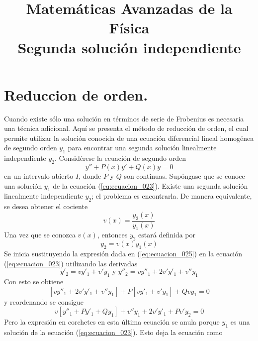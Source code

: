 
\title{Matemáticas Avanzadas de la Física \\ {\large Segunda solución independiente}}
\date{ }

\renewcommand\labelenumii{\theenumi.{\arabic{enumii}}}
\maketitle
\fontsize{14}{14}\selectfont
\section{Reduccion de orden.}
Cuando existe sólo una solución en términos de serie de Frobenius es necesaria una técnica adicional. Aquí se presenta el método de reducción de orden, el cual permite utilizar la solución conocida de una ecuación diferencial lineal homogénea de segundo orden $y_{1}$ para encontrar una segunda solución linealmente independiente $y_{2}$. Considérese la ecuación de segundo orden
\begin{equation}
y'' + P(x) y' + Q(x) y = 0 
\label{eq:ecuacion_023}
\end{equation}
en un intervalo abierto $I$, donde $P$ y $Q$ son continuas. Supóngase que se conoce una solución $y_{1}$ de la ecuación (\ref{eq:ecuacion_023}). Existe una segunda solución linealmente independiente $y_{2}$; el problema es encontrarla. De manera equivalente, se desea obtener el cociente
\begin{equation}
v(x) = \dfrac{y_{2} (x)}{y_{1} (x)}
\label{eq:ecuacion_024}
\end{equation}
Una vez que se conozca $v(x)$, entonces $y_{2}$ estará definida por
\begin{equation}
y_{2} =  v(x) y_{1} (x)
\label{eq:ecuacion_025}
\end{equation}
Se inicia sustituyendo la expresión dada en (\ref{eq:ecuacion_025}) en la ecuación (\ref{eq:ecuacion_023}) utilizando
las derivadas
\[y'_{2} = v y'_{1} + v' y_{1} \mbox{ y } y''_{2} = v y''_{1} +  2 v' y'_{1} + v'' y_{1} \]
Con esto se obtiene
\[ [v y''_{1} +  2 v' y'_{1} + v'' y_{1}] + P [v y'_{1} + v' y_{1}] + Q v y_{1} = 0  \]
y reordenando se consigue
\[ v [ y''_{1} + P y'_{1} + Q y_{1}] + v'' y_{1} + 2 v' y'_{1} + P v' y_{2} = 0 \]
Pero la expresión en corchetes en esta última ecuación se anula porque $y_{1}$ es una solución de la ecuación (\ref{eq:ecuacion_023}). Esto deja la ecuación como
